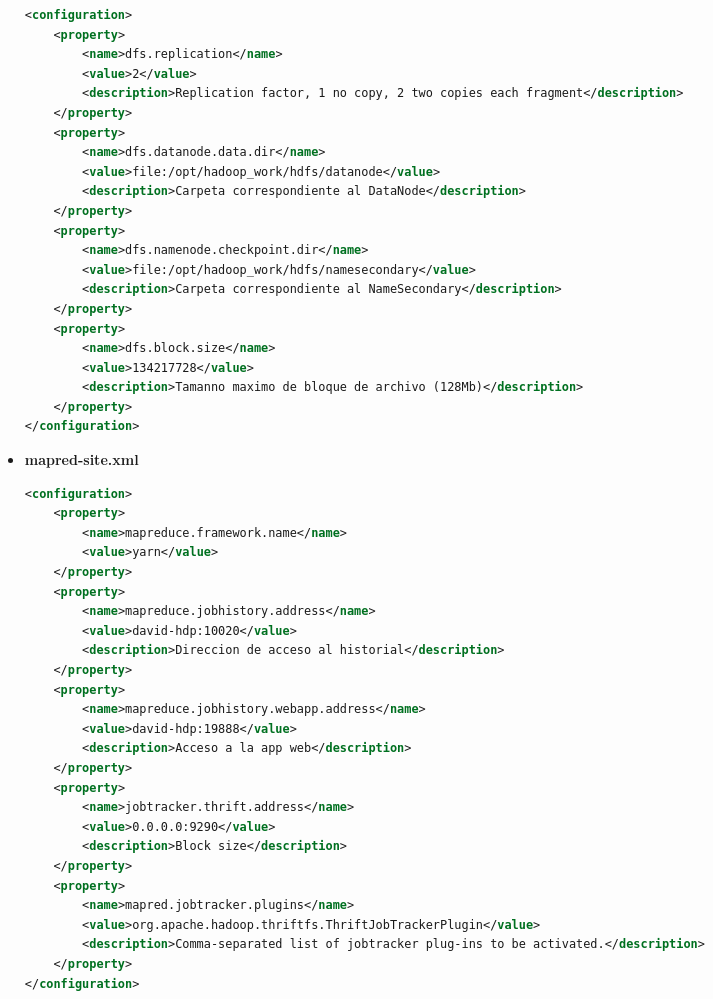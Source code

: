 \begin{itemize}
\clearpage
\begin{lstlisting}[label=hdfssite2,language=XML,frame=single,caption=Contenido del ``hdfs-site.xml'' de los nodos esclavos.]
<configuration>
	<property>
		<name>dfs.replication</name>
		<value>2</value>
		<description>Replication factor, 1 no copy, 2 two copies each fragment</description> 
	</property>
	<property>
		<name>dfs.datanode.data.dir</name>
		<value>file:/opt/hadoop_work/hdfs/datanode</value>
		<description>Carpeta correspondiente al DataNode</description> 
	</property>
	<property>
		<name>dfs.namenode.checkpoint.dir</name>
		<value>file:/opt/hadoop_work/hdfs/namesecondary</value>
		<description>Carpeta correspondiente al NameSecondary</description> 
	</property>
	<property>
		<name>dfs.block.size</name>
		<value>134217728</value>
		<description>Tamanno maximo de bloque de archivo (128Mb)</description> 
	</property>
</configuration>
\end{lstlisting}

\item \textbf{ mapred-site.xml}
\begin{lstlisting}[label=mapredsite,language=XML,frame=single,caption=Contenido del ``mapred-site.xml''.]
<configuration>
	<property>
		<name>mapreduce.framework.name</name>
		<value>yarn</value>
	</property>
	<property>
		<name>mapreduce.jobhistory.address</name>
		<value>david-hdp:10020</value>
		<description>Direccion de acceso al historial</description>
	</property>
	<property>
		<name>mapreduce.jobhistory.webapp.address</name>
		<value>david-hdp:19888</value>
		<description>Acceso a la app web</description>
	</property>
	<property>
		<name>jobtracker.thrift.address</name>
		<value>0.0.0.0:9290</value>
		<description>Block size</description>
	</property>
	<property>
		<name>mapred.jobtracker.plugins</name>
		<value>org.apache.hadoop.thriftfs.ThriftJobTrackerPlugin</value>
		<description>Comma-separated list of jobtracker plug-ins to be activated.</description>
	</property>
</configuration>
\end{lstlisting}


\end{itemize}
